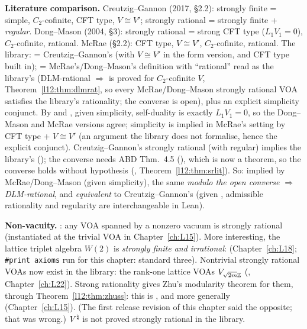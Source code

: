 \begin{dictionary}
\textbf{Literature comparison.} Creutzig--Gannon (2017, §2.2): strongly finite = simple, $C_2$-cofinite, CFT type,
$V\cong V'$; strongly rational = strongly finite + \emph{regular}. Dong--Mason (2004, §3): strongly rational = strong CFT
type ($L_1V_1 = 0$), $C_2$-cofinite, rational. McRae (§2.2): CFT type, $V\cong V'$, $C_2$-cofinite, rational. The library:
 = Creutzig--Gannon's (with $V\cong V'$ in the form version, and CFT type built in);
 = McRae's/Dong--Mason's definition with ``rational'' read as the library's
 (DLM-rational $\Rightarrow$  is proved for $C_2$-cofinite $V$,
Theorem~\ref{l12:thm:dlmrat}, so every McRae/Dong--Mason strongly rational VOA satisfies the library's rationality; the
converse is open), plus an
explicit simplicity conjunct. By
 and , given simplicity, self-duality is exactly $L_1V_1 = 0$, so the
Dong--Mason and McRae versions agree; simplicity is implied in McRae's setting by CFT type + $V\cong V'$ (an argument the
library does not formalise, hence the explicit conjunct). Creutzig--Gannon's strongly rational (with regular) implies the
library's (\allowbreak{}\allowbreak{}); the converse needs ABD Thm.~4.5 (\allowbreak{}\allowbreak{}\allowbreak{}),
which is now a theorem, so the converse holds without hypothesis (, Theorem~\ref{l12:thm:srlit}).
So: implied by McRae/Dong--Mason (given simplicity), the same \emph{modulo the open converse
 $\Rightarrow$ DLM-rational}, and
\emph{equivalent} to Creutzig--Gannon's (given
, admissible rationality and regularity are interchangeable in Lean).

\textbf{Non-vacuity.} \allowbreak{}\allowbreak{}\allowbreak{}: any VOA spanned by a nonzero vacuum is strongly rational
(instantiated at the trivial VOA in Chapter~\ref{ch:L15}). More interesting, the lattice triplet algebra $W(2)$ is
\emph{strongly finite and irrational}:
\allowbreak{}\allowbreak{}\allowbreak{}\allowbreak{}\allowbreak{}\allowbreak{}\allowbreak{} (Chapter~\ref{ch:L18}; \texttt{\#print axioms} run for
this chapter: standard three). Nontrivial strongly rational VOAs now exist in the library: the rank-one lattice VOAs
$V_{\sqrt{2m}{\mathbb{Z}}}$ (, Chapter~\ref{ch:L22}). Strong rationality gives Zhu's modularity theorem for
them, through Theorem~\ref{l12:thm:zhuss}: this is , and more generally
\allowbreak{}\allowbreak{} (Chapter~\ref{ch:L15}). (The first release
revision of this chapter said the opposite; that was wrong.) ${V^{\natural}}$ is not proved strongly rational in the library.
\end{dictionary}

